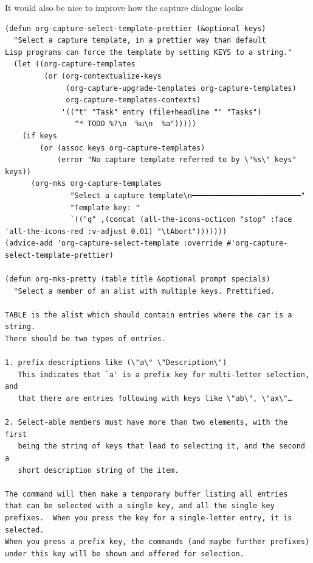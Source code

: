 \documentclass[11pt]{article}
\begin{document}
It would also be nice to improve how the capture dialogue looks

\begin{verbatim}
(defun org-capture-select-template-prettier (&optional keys)
  "Select a capture template, in a prettier way than default
Lisp programs can force the template by setting KEYS to a string."
  (let ((org-capture-templates
         (or (org-contextualize-keys
              (org-capture-upgrade-templates org-capture-templates)
              org-capture-templates-contexts)
             '(("t" "Task" entry (file+headline "" "Tasks")
                "* TODO %?\n  %u\n  %a")))))
    (if keys
        (or (assoc keys org-capture-templates)
            (error "No capture template referred to by \"%s\" keys" keys))
      (org-mks org-capture-templates
               "Select a capture template\n━━━━━━━━━━━━━━━━━━━━━━━━━"
               "Template key: "
               `(("q" ,(concat (all-the-icons-octicon "stop" :face 'all-the-icons-red :v-adjust 0.01) "\tAbort")))))))
(advice-add 'org-capture-select-template :override #'org-capture-select-template-prettier)

(defun org-mks-pretty (table title &optional prompt specials)
  "Select a member of an alist with multiple keys. Prettified.

TABLE is the alist which should contain entries where the car is a string.
There should be two types of entries.

1. prefix descriptions like (\"a\" \"Description\")
   This indicates that `a' is a prefix key for multi-letter selection, and
   that there are entries following with keys like \"ab\", \"ax\"…

2. Select-able members must have more than two elements, with the first
   being the string of keys that lead to selecting it, and the second a
   short description string of the item.

The command will then make a temporary buffer listing all entries
that can be selected with a single key, and all the single key
prefixes.  When you press the key for a single-letter entry, it is selected.
When you press a prefix key, the commands (and maybe further prefixes)
under this key will be shown and offered for selection.


\end{verbatim}
\end{document}
